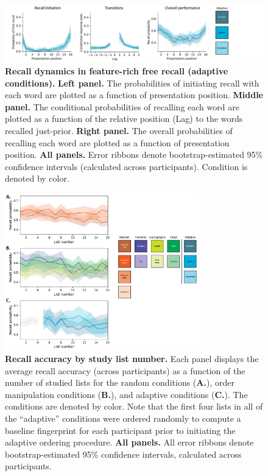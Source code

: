 \documentclass{article}
\begin{document}
\begin{figure}[p] \centering
    \includegraphics[width=\textwidth]{figures/recall_dynamics_adaptive}
    
    \caption{\textbf{Recall dynamics in feature-rich free recall (adaptive conditions).} \textbf{Left panel.} The probabilities of
    initiating recall with each word are plotted as a function of presentation
    position. \textbf{Middle panel.} The conditional probabilities of recalling
    each word are plotted as a function of the relative position (Lag) to the words
    recalled just-prior. \textbf{Right panel.} The overall probabilities of
    recalling each word are plotted as a function of presentation position.
    \textbf{All panels.} Error ribbons denote bootstrap-estimated 95\% confidence
    intervals (calculated across participants). Condition is denoted by color.}
    
        \label{fig:recall-dynamics-adaptive}
    \end{figure}


\begin{figure}[tp] \centering
    \includegraphics[width=0.75\textwidth]{figures/accuracy_by_list}
    
\caption{\textbf{Recall accuracy by study list number.} Each panel displays the
average recall accuracy (across participants) as a function of the number of
studied lists for the random conditions (\textbf{A.}), order manipulation
conditions (\textbf{B.}), and adaptive conditions (\textbf{C.}). The conditions
are denoted by color. Note that the first four lists in all of the ``adaptive''
conditions were ordered randomly to compute a baseline fingerprint for each
participant prior to initiating the adaptive ordering procedure. \textbf{All
panels.} All error ribbons denote bootstrap-estimated 95\% confidence
intervals, calculated across participants.} 
\label{fig:accuracy-by-list}

\end{figure}
\end{document}
